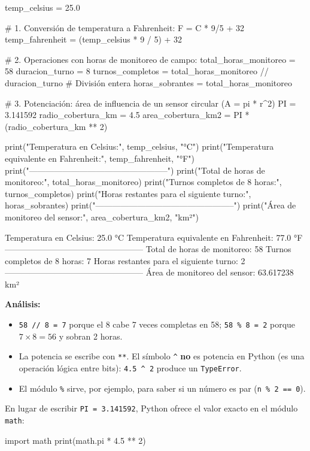 \documentclass[11pt,a4paper]{article}
\newcommand{\code}[1]{\texttt{#1}}
\begin{document}
\begin{codigo}
temp_celsius = 25.0

# 1. Conversión de temperatura a Fahrenheit: F = C * 9/5 + 32
temp_fahrenheit = (temp_celsius * 9 / 5) + 32

# 2. Operaciones con horas de monitoreo de campo:
total_horas_monitoreo = 58
duracion_turno = 8
turnos_completos = total_horas_monitoreo // duracion_turno  # División entera
horas_sobrantes = total_horas_monitoreo %

# 3. Potenciación: área de influencia de un sensor circular (A = pi * r^2)
PI = 3.141592
radio_cobertura_km = 4.5
area_cobertura_km2 = PI * (radio_cobertura_km ** 2)

print("Temperatura en Celsius:", temp_celsius, "°C")
print("Temperatura equivalente en Fahrenheit:", temp_fahrenheit, "°F")
print("--------------------------------------------------")
print("Total de horas de monitoreo:", total_horas_monitoreo)
print("Turnos completos de 8 horas:", turnos_completos)
print("Horas restantes para el siguiente turno:", horas_sobrantes)
print("--------------------------------------------------")
print("Área de monitoreo del sensor:", area_cobertura_km2, "km²")
\end{codigo}
\begin{salida}
Temperatura en Celsius: 25.0 °C
Temperatura equivalente en Fahrenheit: 77.0 °F
--------------------------------------------------
Total de horas de monitoreo: 58
Turnos completos de 8 horas: 7
Horas restantes para el siguiente turno: 2
--------------------------------------------------
Área de monitoreo del sensor: 63.617238 km²
\end{salida}

\textbf{Análisis:}
\begin{itemize}
  \item \code{58 // 8 = 7} porque el 8 cabe 7 veces completas en 58; \code{58 \% 8 = 2} porque $7 \times 8 = 56$ y sobran 2 horas.
  \item La potencia se escribe con \code{**}. El símbolo \code{\^{}} \textbf{no} es potencia en Python (es una operación lógica entre bits): \code{4.5 \^{} 2} produce un \code{TypeError}.
  \item El módulo \code{\%} sirve, por ejemplo, para saber si un número es par (\code{n \% 2 == 0}).
\end{itemize}

\begin{tip}
En lugar de escribir \code{PI = 3.141592}, Python ofrece el valor exacto en el módulo \code{math}:
\begin{codigo}
import math
print(math.pi * 4.5 ** 2)
\end{codigo}
\end{tip}
\end{document}
